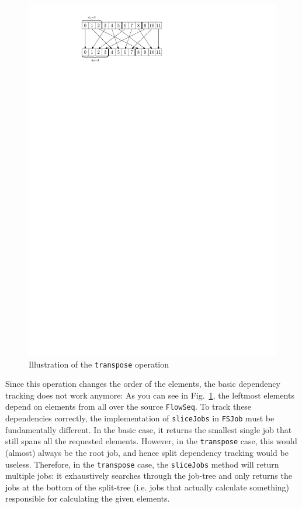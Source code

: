\documentclass[runningheads,a4paper,fleqn]{llncs}
\begin{document}
\begin{figure}
\centering
\includegraphics{transpose}
\caption{Illustration of the \texttt{transpose} operation}
\label{fig:transpose}
\end{figure}

Since this operation changes the order of the elements, the basic
dependency tracking does not work anymore: As you can see in
Fig.~\ref{fig:transpose}, the leftmost elements depend on elements from
all over the source \texttt{FlowSeq}. To track these dependencies
correctly, the implementation of \texttt{sliceJobs} in \texttt{FSJob}
must be fundamentally different. In the 
basic case, it returns the smallest single job that still spans all
the requested elements. However, in the \texttt{transpose} case, this
would (almost)
always be the root job, and hence split dependency tracking would
be useless. Therefore,
in the \texttt{transpose} case, the \texttt{sliceJobs} method will
return multiple jobs: it exhaustively searches through the job-tree
and only returns the jobs at the bottom of the split-tree (i.e. jobs
that actually calculate something) responsible for calculating the
given elements.
\end{document}

